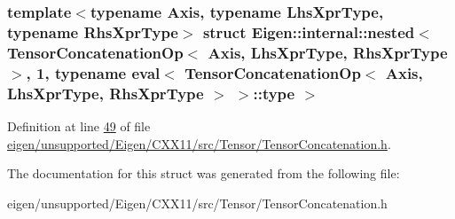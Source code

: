 \subsubsection*{template$<$typename Axis, typename Lhs\+Xpr\+Type, typename Rhs\+Xpr\+Type$>$\newline
struct Eigen\+::internal\+::nested$<$ Tensor\+Concatenation\+Op$<$ Axis, Lhs\+Xpr\+Type, Rhs\+Xpr\+Type $>$, 1, typename eval$<$ Tensor\+Concatenation\+Op$<$ Axis, Lhs\+Xpr\+Type, Rhs\+Xpr\+Type $>$ $>$\+::type $>$}



Definition at line \hyperlink{eigen_2unsupported_2_eigen_2_c_x_x11_2src_2_tensor_2_tensor_concatenation_8h_source_l00049}{49} of file \hyperlink{eigen_2unsupported_2_eigen_2_c_x_x11_2src_2_tensor_2_tensor_concatenation_8h_source}{eigen/unsupported/\+Eigen/\+C\+X\+X11/src/\+Tensor/\+Tensor\+Concatenation.\+h}.



The documentation for this struct was generated from the following file\+:\begin{DoxyCompactItemize}
\item 
eigen/unsupported/\+Eigen/\+C\+X\+X11/src/\+Tensor/\+Tensor\+Concatenation.\+h\end{DoxyCompactItemize}
